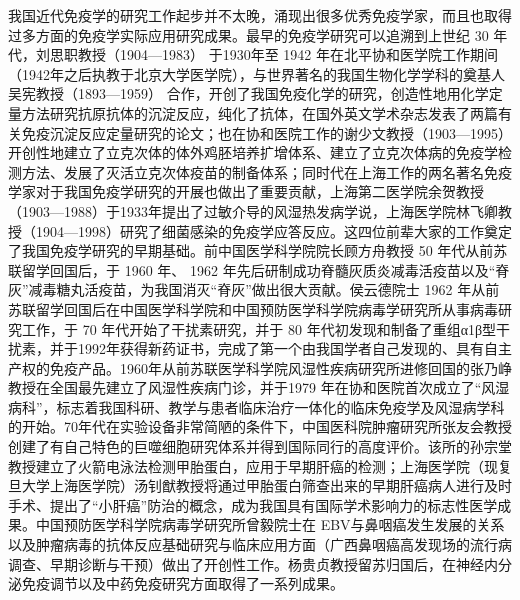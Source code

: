 我国近代免疫学的研究工作起步并不太晚，涌现出很多优秀免疫学家，而且也取得过多方面的免疫学实际应用研究成果。最早的免疫学研究可以追溯到上世纪
30 年代，刘思职教授（1904---1983） 于1930年至 1942
年在北平协和医学院工作期间（1942年之后执教于北京大学医学院），与世界著名的我国生物化学学科的奠基人吴宪教授（1893---1959）
合作，开创了我国免疫化学的研究，创造性地用化学定量方法研究抗原抗体的沉淀反应，纯化了抗体，在国外英文学术杂志发表了两篇有关免疫沉淀反应定量研究的论文；也在协和医院工作的谢少文教授（1903---1995）开创性地建立了立克次体的体外鸡胚培养扩增体系、建立了立克次体病的免疫学检测方法、发展了灭活立克次体疫苗的制备体系；同时代在上海工作的两名著名免疫学家对于我国免疫学研究的开展也做出了重要贡献，上海第二医学院余贺教授（1903---1988）于1933年提出了过敏介导的风湿热发病学说，上海医学院林飞卿教授（1904---1998）研究了细菌感染的免疫学应答反应。这四位前辈大家的工作奠定了我国免疫学研究的早期基础。前中国医学科学院院长顾方舟教授
50 年代从前苏联留学回国后，于 1960 年、 1962
年先后研制成功脊髓灰质炎减毒活疫苗以及“脊灰”减毒糖丸活疫苗，为我国消灭“脊灰”做出很大贡献。侯云德院士
1962
年从前苏联留学回国后在中国医学科学院和中国预防医学科学院病毒学研究所从事病毒研究工作，于
70 年代开始了干扰素研究，并于 80
年代初发现和制备了重组α1β型干扰素，并于1992年获得新药证书，完成了第一个由我国学者自己发现的、具有自主产权的免疫产品。1960年从前苏联医学科学院风湿性疾病研究所进修回国的张乃峥教授在全国最先建立了风湿性疾病门诊，并于1979
年在协和医院首次成立了“风湿病科”，标志着我国科研、教学与患者临床治疗一体化的临床免疫学及风湿病学科的开始。70年代在实验设备非常简陋的条件下，中国医科院肿瘤研究所张友会教授创建了有自己特色的巨噬细胞研究体系并得到国际同行的高度评价。该所的孙宗堂教授建立了火箭电泳法检测甲胎蛋白，应用于早期肝癌的检测；上海医学院（现复旦大学上海医学院）汤钊猷教授将通过甲胎蛋白筛查出来的早期肝癌病人进行及时手术、提出了“小肝癌”防治的概念，成为我国具有国际学术影响力的标志性医学成果。中国预防医学科学院病毒学研究所曾毅院士在
EBV与鼻咽癌发生发展的关系以及肿瘤病毒的抗体反应基础研究与临床应用方面（广西鼻咽癌高发现场的流行病调查、早期诊断与干预）做出了开创性工作。杨贵贞教授留苏归国后，在神经内分泌免疫调节以及中药免疫研究方面取得了一系列成果。

